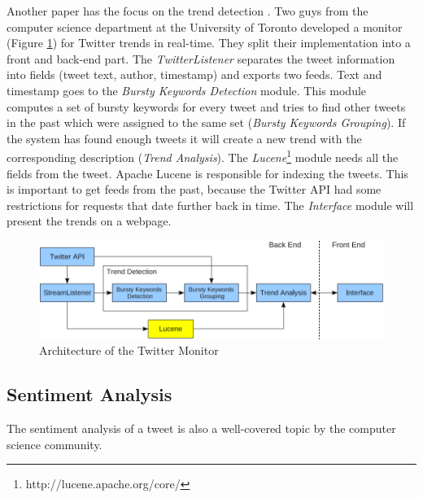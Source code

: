\documentclass[a4paper]{article}
\begin{document}
Another paper has the focus on the trend detection \cite{Mathioudakis2010}. Two guys from the computer science department at the University of Toronto developed a monitor (Figure \ref{monitorArchitecture}) for Twitter trends in real-time. They split their implementation into a front and back-end part. The \textit{TwitterListener} separates the tweet information into fields (tweet text, author, timestamp) and exports two feeds. Text and timestamp goes to the \textit{Bursty Keywords Detection} module. This module computes a set of bursty keywords for every tweet and tries to find other tweets in the past which were assigned to the same set (\textit{Bursty Keywords Grouping}). If the system has found enough tweets it will create a new trend with the corresponding description (\textit{Trend Analysis}). The \textit{Lucene}\footnote{http://lucene.apache.org/core/} module needs all the fields from the tweet. Apache Lucene is responsible for indexing the tweets. This is important to get feeds from the past, because the Twitter API had some restrictions for requests that date further back in time. The \textit{Interface} module will present the trends on a webpage.
\begin{figure}[h!]
	\centering
	\includegraphics[scale=0.45]{images/monitorArchitecture.png}
	\caption{Architecture of the Twitter Monitor}
	\label{monitorArchitecture}
\end{figure}

\subsection{Sentiment Analysis}
The sentiment analysis of a tweet is also a well-covered topic by the computer science community.\\ 
\end{document}
